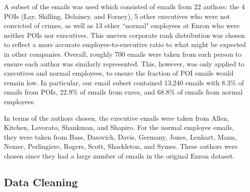 
A subset of the emails was used which consisted of emails from 22 authors: the 4 POIs (Lay, Skilling, Delainey, and Forney), 5 other executives who were not convicted of crimes, as well as 13 other ``normal" employees at Enron who were neither POIs nor executives. This uneven corporate rank distribution was chosen to reflect a more accurate employee-to-executive ratio to what might be expected in other companies. Overall, roughly 700 emails were taken from each person to ensure each author was similarly represented. This, however, was only applied to executives and normal employees, to ensure the fraction of POI emails would remain low. %
In particular, our email subset contained 13,240 emails with 8.3\% of emails from POIs, 22.9\% of emails from execs, and 68.8\% of emails from normal employees. 

In terms of the authors chosen, the executive emails were taken from Allen, Kitchen, Lavorato, Shankman, and Shapiro. For the normal employee emails, they were taken from Bass, Dasovich, Davis, Germany, Jones, Lenhart, Mann, Nemec, Perlingiere, Rogers, Scott, Shackleton, and Symes. These authors were chosen since they had a large number of emails in the original Enron dataset.


\subsection{Data Cleaning}

